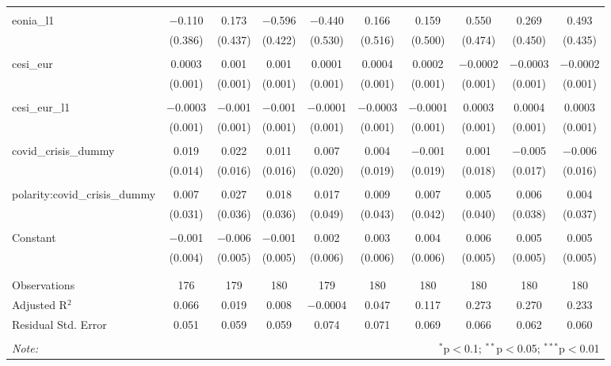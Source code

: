 \begin{table}[!htbp]
\begin{adjustbox}{width=1.25\textwidth}
\begin{tabular}{@{\extracolsep{5pt}}lccccccccc}
  & & & & & & & & & \\ 
 eonia\_l1 & $-$0.110 & 0.173 & $-$0.596 & $-$0.440 & 0.166 & 0.159 & 0.550 & 0.269 & 0.493 \\ 
  & (0.386) & (0.437) & (0.422) & (0.530) & (0.516) & (0.500) & (0.474) & (0.450) & (0.435) \\ 
  & & & & & & & & & \\ 
 cesi\_eur & 0.0003 & 0.001 & 0.001 & 0.0001 & 0.0004 & 0.0002 & $-$0.0002 & $-$0.0003 & $-$0.0002 \\ 
  & (0.001) & (0.001) & (0.001) & (0.001) & (0.001) & (0.001) & (0.001) & (0.001) & (0.001) \\ 
  & & & & & & & & & \\ 
 cesi\_eur\_l1 & $-$0.0003 & $-$0.001 & $-$0.001 & $-$0.0001 & $-$0.0003 & $-$0.0001 & 0.0003 & 0.0004 & 0.0003 \\ 
  & (0.001) & (0.001) & (0.001) & (0.001) & (0.001) & (0.001) & (0.001) & (0.001) & (0.001) \\ 
  & & & & & & & & & \\ 
 covid\_crisis\_dummy & 0.019 & 0.022 & 0.011 & 0.007 & 0.004 & $-$0.001 & 0.001 & $-$0.005 & $-$0.006 \\ 
  & (0.014) & (0.016) & (0.016) & (0.020) & (0.019) & (0.019) & (0.018) & (0.017) & (0.016) \\ 
  & & & & & & & & & \\ 
 polarity:covid\_crisis\_dummy & 0.007 & 0.027 & 0.018 & 0.017 & 0.009 & 0.007 & 0.005 & 0.006 & 0.004 \\ 
  & (0.031) & (0.036) & (0.036) & (0.049) & (0.043) & (0.042) & (0.040) & (0.038) & (0.037) \\ 
  & & & & & & & & & \\ 
 Constant & $-$0.001 & $-$0.006 & $-$0.001 & 0.002 & 0.003 & 0.004 & 0.006 & 0.005 & 0.005 \\ 
  & (0.004) & (0.005) & (0.005) & (0.006) & (0.006) & (0.006) & (0.005) & (0.005) & (0.005) \\ 
  & & & & & & & & & \\ 
\hline \\[-1.8ex] 
Observations & 176 & 179 & 180 & 179 & 180 & 180 & 180 & 180 & 180 \\ 
Adjusted R$^{2}$ & 0.066 & 0.019 & 0.008 & $-$0.0004 & 0.047 & 0.117 & 0.273 & 0.270 & 0.233 \\ 
Residual Std. Error & 0.051 & 0.059 & 0.059 & 0.074 & 0.071 & 0.069 & 0.066 & 0.062 & 0.060 \\ 
\hline 
\hline \\[-1.8ex] 
\textit{Note:}  & \multicolumn{9}{r}{$^{*}$p$<$0.1; $^{**}$p$<$0.05; $^{***}$p$<$0.01} \\ 
\end{tabular} 
\end{adjustbox} 
\end{table} 
